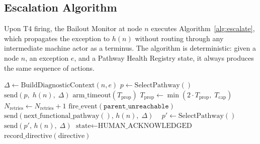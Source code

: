 \subsection{Escalation Algorithm}\label{sec:escalation-algorithm}

Upon T4 firing, the Bailout Monitor at node $n$ executes Algorithm~\ref{alg:escalate}, which propagates the exception to $h(n)$ without routing through any intermediate machine actor as a terminus. The algorithm is deterministic: given a node $n$, an exception $e$, and a Pathway Health Registry state, it always produces the same sequence of actions.

\begin{algorithm}[htbp]
\caption{Bailout Protocol escalation algorithm. Propagates exception $e$ from originating node $n$ to human anchor $h(n)$ via the parent-chain bypass. No intermediate machine actor may absorb, redirect, or suppress the escalation.}
\label{alg:escalate}
\begin{algorithmic}[1]
\Statex
{}
\State $\Delta \gets \text{BuildDiagnosticContext}(n, e)$ 
\State $p \gets \text{SelectPathway}()$ 
\State $\text{send}(p,\; h(n),\; \Delta)$ 
\State $\text{arm\_timeout}(T_{\text{prop}})$ 
\Statex
{}
\State $T_{\text{prop}} \gets \min(2 \cdot T_{\text{prop}},\; T_{\text{cap}})$ 
\State $N_{\text{retries}} \gets N_{\text{retries}} + 1$
\Statex
{} 
\State $\text{fire\_event}(\texttt{parent\_unreachable})$ 
\Statex
{} 
\State $\text{send}(\text{next\_functional\_pathway}(),\, h(n),\; \Delta)$
\Statex
\Else\ 
\State $p' \gets \text{SelectPathway}()$
\State $\text{send}(p',\, h(n),\; \Delta)$
\Statex
\EndIf
\Statex
{}
\State $\text{state} \gets \text{HUMAN\_ACKNOWLEDGED}$ 
\Statex
{} 
\State $\text{record\_directive}(\text{directive})$ 

\end{algorithmic}
\end{algorithm}
